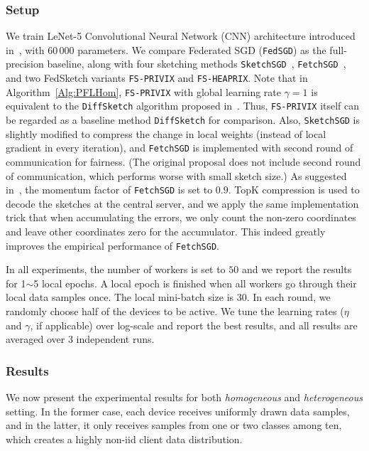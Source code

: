 \documentclass[sigconf, anonymous, review]{acmart}
\begin{document}
\subsubsection{Setup}

We train LeNet-5 Convolutional Neural Network (CNN) architecture introduced in~\cite{lecun1998gradient}, with $60\,000$ parameters.
We compare Federated SGD (\texttt{FedSGD}) as the full-precision baseline, along with four sketching methods \texttt{SketchSGD}~\citep{ivkin2019communication}, \texttt{FetchSGD}~\citep{rothchild2020fetchsgd}, and two FedSketch variants \texttt{FS-PRIVIX} and \texttt{FS-HEAPRIX}.
Note that in Algorithm~\ref{Alg:PFLHom}, \texttt{FS-PRIVIX} with global learning rate $\gamma=1$ is equivalent to the \texttt{DiffSketch} algorithm proposed in~\cite{li2018federated}. Thus, \texttt{FS-PRIVIX} itself can be regarded as a baseline method \texttt{DiffSketch} for comparison. Also, \texttt{SketchSGD} is slightly modified to compress the change in local weights (instead of local gradient in every iteration), and \texttt{FetchSGD} is implemented with second round of communication for fairness. (The original proposal does not include second round of communication, which performs worse with small sketch size.) As suggested in~\cite{rothchild2020fetchsgd}, the momentum factor of \texttt{FetchSGD} is set to $0.9$. TopK compression is used to decode the sketches at the central server, and we apply the same implementation trick that when accumulating the errors, we only count the non-zero coordinates and leave other coordinates zero for the accumulator. This indeed greatly improves the empirical performance of \texttt{FetchSGD}.

In all experiments, the number of workers is set to $50$ and we report the results for 1$\sim$5 local epochs. A local epoch is finished when all workers go through their local data samples once. The local mini-batch size is 30. In each round, we randomly choose half of the devices to be active. 
We tune the learning rates ($\eta$ and $\gamma$, if applicable) over log-scale and report the best results, and all results are averaged over 3 independent runs.

\subsubsection{Results} 

We now present the experimental results for both \emph{homogeneous} and \emph{heterogeneous} setting. 
In the former case, each device receives uniformly drawn data samples, and in the latter, it only receives samples from one or two classes among ten, which creates a highly non-iid client data distribution. 
\end{document}
